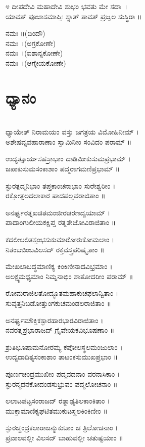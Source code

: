 ೪ ದೀಪದೇವಿ ಮಹಾದೇವಿ ಶುಭಂ ಭವತು ಮೇ ಸದಾ~।\\
ಯಾವತ್ ಪೂಜಾಸಮಾಪ್ತಿಃ ಸ್ಯಾತ್ ತಾವತ್ ಪ್ರಜ್ವಲ ಸುಸ್ಥಿರಾ ॥

 ನಮಃ ॥(ಬಿಂದೌ)\\
 ನಮಃ~।(ಅಗ್ರಕೋಣೇ)\\
 ನಮಃ~।(ಐಶಾನ್ಯಕೋಣೇ)\\
 ನಮಃ~।(ಆಗ್ನೇಯಕೋಣೇ)
\section{ಧ್ಯಾನಂ}
\\
ಧ್ಯಾಯೇತ್ ನಿರಾಮಯಂ ವಸ್ತು ಜಗತ್ರಯ ವಿಮೋಹಿನೀಮ್ ।\\
ಅಶೇಷವ್ಯವಹಾರಾಣಾಂ  ಸ್ವಾಮಿನೀಂ ಸಂವಿದಂ ಪರಾಮ್ ॥

ಉದ್ಯತ್ಸೂರ್ಯಸಹಸ್ರಾಭಾಂ ದಾಡಿಮೀಕುಸುಮಪ್ರಭಾಮ್ ।\\
ಜಪಾಕುಸುಮಸಂಕಾಶಾಂ ಪದ್ಮರಾಗಮಣಿಪ್ರಭಾಮ್ ॥

ಸ್ಫುರತ್ಪದ್ಮನಿಭಾಂ ತಪ್ತಕಾಂಚನಾಭಾಂ ಸುರೇಶ್ವರೀಂ ।\\
ರಕ್ತೋತ್ಪಲದಲಾಕಾರ ಪಾದಪಲ್ಲವರಾಜಿತಾಂ ॥

ಅನರ್ಘ್ಯರತ್ನಖಚಿತಮಂಜೀರಚರಣದ್ವಯಾಮ್ ।\\
ಪಾದಾಂಗುಲೀಯಕಕ್ಷಿಪ್ತ ರತ್ನತೇಜೋವಿರಾಜಿತಾಂ ॥

ಕದಲೀಲಲಿತಸ್ತಂಭಸುಕುಮಾರೋರುಕೋಮಲಾಂ ।\\
ನಿತಂಬಬಿಂಬವಿಲಸದ್ ರಕ್ತವಸ್ತ್ರಪರಿಷ್ಕೃತಾಂ ॥

ಮೇಖಲಾಬದ್ಧಮಾಣಿಕ್ಯ ಕಿಂಕಿಣೀನಾದವಿಭ್ರಮಾಂ ।\\
ಅಲಕ್ಷ್ಯಮಧ್ಯಮಾಂ ನಿಮ್ನನಾಭಿಂ ಶಾತೋದರೀಂ ಪರಾಮ್ ॥

ರೋಮರಾಜಿಲತೋದ್ಭೂತಮಹಾಕುಚಫಲಾನ್ವಿತಾಂ ।\\
ಸುವೃತ್ತನಿಬಡೋತ್ತುಂಗಕುಚಮಂಡಲರಾಜಿತಾಂ ॥

ಅನರ್ಘ್ಯಮೌಕ್ತಿಕಸ್ಫಾರಹಾರಭಾರವಿರಾಜಿತಾಂ ।\\
ನವರತ್ನಪ್ರಭಾರಾಜದ್ ಗ್ರೈವೇಯಕವಿಭೂಷಣಾಂ ॥

ಶ್ರುತಿಭೂಷಾಮನೋರಮ್ಯ ಕಪೋಲಸ್ಥಲಮಂಜುಲಾಂ ।\\
ಉದ್ಯದಾದಿತ್ಯಸಂಕಾಶಾಂ ತಾಟಂಕಸುಮುಖಪ್ರಭಾಂ ॥

ಪೂರ್ಣಚಂದ್ರಮುಖೀಂ ಪದ್ಮವದನಾಂ ವರನಾಸಿಕಾಂ ।\\
ಸ್ಫುರನ್ಮದನಕೋದಂಡಸುಭ್ರುವಂ ಪದ್ಮಲೋಚನಾಂ ॥

ಲಲಾಟಪಟ್ಟಸಂರಾಜದ್ ರತ್ನಾಢ್ಯತಿಲಕಾಂಕಿತಾಂ ।\\
ಮುಕ್ತಾಮಾಣಿಕ್ಯಘಟಿತಮುಕುಟಸ್ಥಲಕಿಂಕಿಣೀಂ ॥

ಸ್ಫುರಚ್ಚಂದ್ರಕಲಾರಾಜನ್ಮುಕುಟಾಂ ಚ ತ್ರಿಲೋಚನಾಂ ।\\
ಪ್ರವಾಲವಲ್ಲೀ ವಿಲಸದ್ ಬಾಹುವಲ್ಲೀ ಚತುಷ್ಟಯಾಂ ॥

